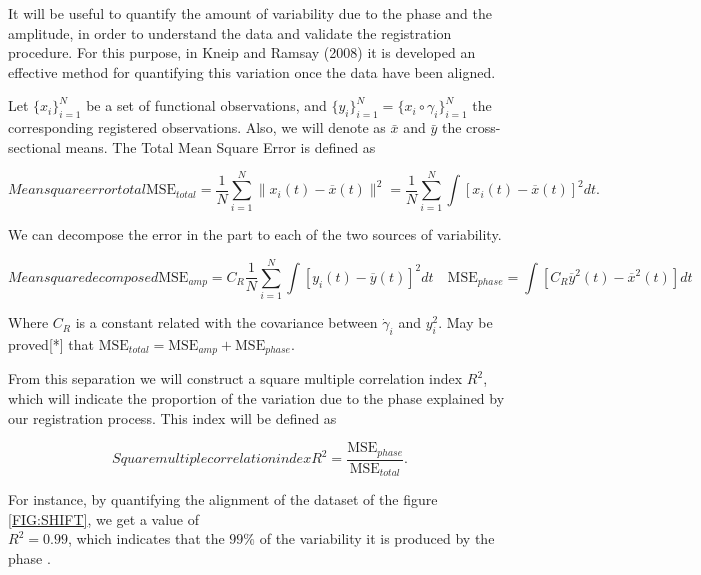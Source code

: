 It will be useful to quantify the amount of variability due to the phase and the
amplitude, in order to understand the data and validate the registration
procedure. For this purpose, in Kneip and Ramsay (2008)
\cite{RamsayAlois2008} it is developed an effective method for quantifying
this variation once the data have been aligned.

Let $\{x_i\}_{i=1}^N$ be a set of functional observations, and
$\{y_i\}_{i=1}^N = \{x_i \circ \gamma_i\}_{i=1}^N$ the corresponding registered
observations. Also, we will denote as $\bar x$ and $\bar y$ the
cross-sectional means. The Total Mean Square Error is defined as

\begin{equation}[]{Mean square error total}
\text{MSE}_{total}=  \frac{1}{N}\sum_{i=1}^{N} \|x_i(t)-\overline x(t)\|^2 =
\frac{1}{N}\sum_{i=1}^{N}\int[x_i(t)-\overline x(t)]^2dt .
\end{equation}

We can decompose the error in the part to each of the two sources of variability.

\begin{equation}[]{Mean square decomposed}
\text{MSE}_{amp} =  C_R \frac{1}{N}
        \sum_{i=1}^{N} \int \left [ y_i(t) - \overline{y}(t) \right ]^2 dt \quad
\text{MSE}_{phase}=
        \int \left [C_R \overline{y}^2(t) - \overline{x}^2(t) \right]dt
\end{equation}

Where $C_R$ is a constant related with the covariance between $\dot \gamma_i$
and $y_i^2$. May be  proved[*] that 
$
\text{MSE}_{total} = \text{MSE}_{amp} + \text{MSE}_{phase}.
$


From this separation we will construct a square multiple correlation index
$R^2$, which will indicate the proportion of the variation due to the phase
explained by our registration process. This index will be defined as

\begin{equation}[]{Square multiple correlation index}
R^2 = \frac{\text{MSE}_{phase}}{\text{MSE}_{total}}.
\end{equation}

For instance, by quantifying the alignment of the dataset of the figure
\ref{FIG:SHIFT}, we get a value of \\ $R^2=0.99$, which indicates that the $99\%$ of
the variability it is produced by the phase .
